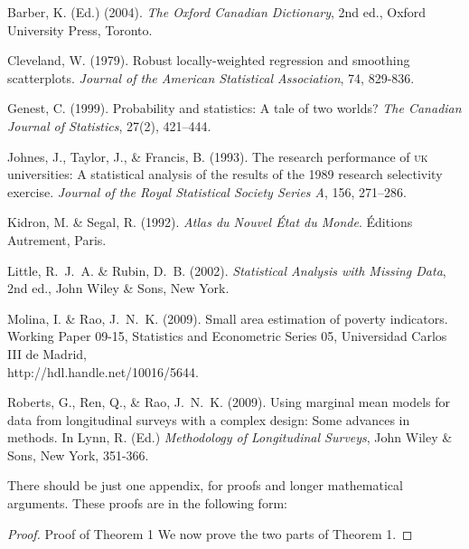\documentclass[12pt]{TD-CJS}
\begin{document}
\begin{thebibliography}{}
Barber, K. (Ed.) (2004). {\it The Oxford Canadian Dictionary}, 2nd ed., 
Oxford University Press, Toronto.

Cleveland, W. (1979). Robust locally-weighted regression and smoothing scatterplots. 
{\it Journal of the American Statistical Association}, 74, 829-836.

Genest, C. (1999). Probability and statistics: A tale of two worlds? 
{\it The Canadian Journal of Statistics}, 27(2), 421--444.

Johnes, J., Taylor, J., \& Francis, B. (1993). The research
performance of \textsc{uk} universities: A statistical analysis of the results
of the 1989 research selectivity exercise. {\it Journal of the Royal
Statistical Society Series A}, 156, 271--286.

Kidron, M. \& Segal, R. (1992). {\it Atlas du Nouvel \'Etat
du Monde}. \'Editions Autrement, Paris.

Little, R.~J.~A. \& Rubin, D.~B. (2002). {\it Statistical Analysis with Missing Data}, 2nd ed., 
John Wiley \& Sons, New York.

Molina, I. \& Rao, J.~N.~K. (2009). Small area estimation of poverty indicators. Working Paper 09-15, Statistics and Econometric Series 05, Universidad Carlos III de Madrid, \\http://hdl.handle.net/10016/5644.

Roberts, G., Ren, Q., \& Rao, J.~N.~K. (2009). 
Using marginal mean models for data from longitudinal surveys
with a complex design: Some advances in methods. In Lynn, R. (Ed.) {\it Methodology of Longitudinal Surveys}, 
John Wiley \& Sons, New York, 351-366.
\end{thebibliography}

\begin{appendix}
There should be just one appendix, for proofs and longer
mathematical arguments. These proofs are in the following form:

\begin{proof}{Proof of Theorem 1}{}%
We now prove the two parts of Theorem 1.
\end{proof}
\end{appendix}

\CJShistory
\end{document}
